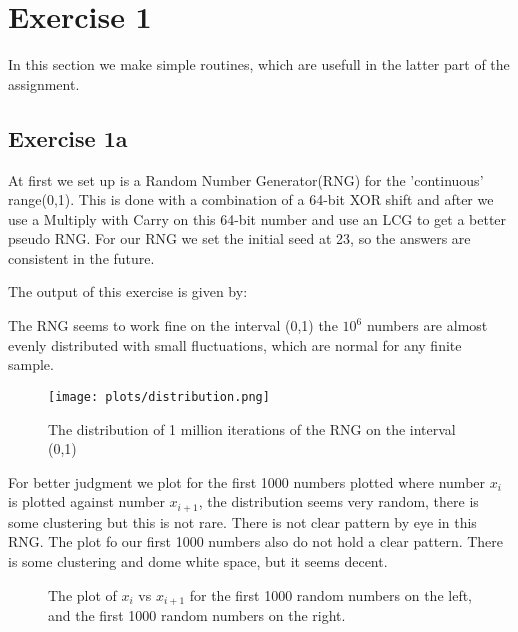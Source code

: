 \section{Exercise 1}
In this section we make simple routines, which are usefull in the latter part of the assignment.

\subsection{Exercise 1a}
At first we set up is a Random Number Generator(RNG) for the 'continuous' range(0,1). This is done with a combination of a 64-bit XOR shift and after we use a Multiply with Carry on this 64-bit number and use an LCG to get a better pseudo RNG. For our RNG we set the initial seed at 23, so the answers are consistent in the future. 

The output of this exercise is given by:


The RNG seems to work fine on the interval (0,1) the $10^6$ numbers are almost evenly distributed with small fluctuations, which are normal for any finite sample.
\begin{figure}[h]
   \centering
   \texttt{[image: plots/distribution.png]}
      \caption{The distribution of 1 million iterations of the RNG on the interval (0,1)}
   \end{figure}
  
 
 For better judgment we plot for the first 1000 numbers plotted where number $x_i$ is plotted against number $x_{i+1}$, the distribution seems very random, there is some clustering but this is not rare. There is not clear pattern by eye in this RNG. The plot fo our first 1000 numbers also do not hold a clear pattern. There is some clustering and dome white space, but it seems decent.
 
\begin{figure}
   \centering
    \qquad
    \caption{The plot of $x_i$ vs $x_{i+1}$ for the first 1000 random numbers on the left, and the first 1000 random numbers on the right. }
    \end{figure}
    
    
